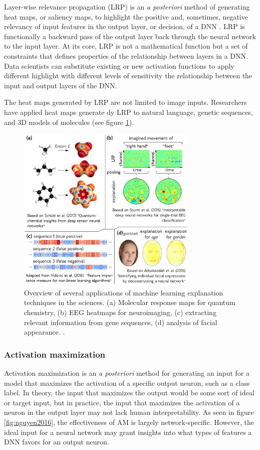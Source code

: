 Layer-wise relevance propagation (LRP) is an \textit{a posteriori} method of generating heat maps, or saliency maps, to highlight the positive and, sometimes, negative relevancy of input features in the output layer, or decision, of a DNN \cite{MONTAVON20181}.  LRP is functionally a backward pass of the output layer back through the neural network to the input layer.  At its core, LRP is not a mathematical function but a set of constraints that defines properties of the relationship between layers in a DNN.  Data scientists can substitute existing or new activation functions to apply different highlight with different levels of sensitivity the relationship between the input and output layers of the DNN.

The heat maps generated by LRP are not limited to image inputs.  Researchers have applied heat maps generate dy LRP to natural language, genetic sequences, and 3D models of molecules (see figure \ref{fig:montavan2018}).

\begin{figure}
    \centering
    \includegraphics[width=3.4in]{media/montavan2018.png}
    \caption{Overview of several applications of machine learning explanation techniques in the sciences. (a) Molecular response maps for quantum chemistry, (b) EEG heatmaps for neuroimaging, (c) extracting relevant information from gene sequences, (d) analysis of facial appearance. \cite{MONTAVON20181}.}
    \label{fig:montavan2018}
\end{figure}

\subsubsection{Activation maximization}

Activation maximization is an \textit{a posteriori} method for generating an input for a model that maximizes the activation of a specific output neuron\cite{Nguyen2016}, such as a class label.  In theory, the input that maximizes the output would be some sort of ideal or target input, but in practice, the input that maximizes the activation of a neuron in the output layer may not lack human interpretability.  As seen in figure \ref{fig:nguyen2016}, the effectiveness of AM is largely network-specific.  However, the ideal input for a neural network may grant insights into what types of features a DNN favors for an output neuron.

